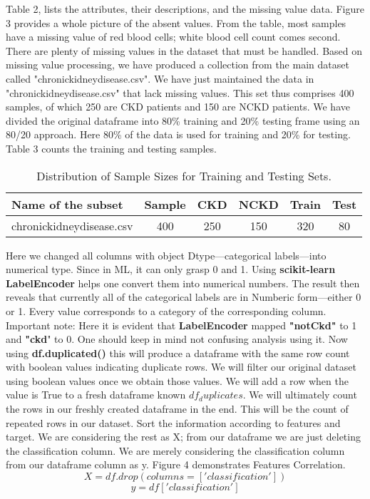 \documentclass[conference]{IEEEtran}
\begin{document}
Table 2, lists the attributes, their descriptions, and the missing value data. Figure 3 provides a whole picture of the absent values. From the table, most samples have a missing value of red blood cells; white blood cell count comes second. There are plenty of missing values in the dataset that must be handled. Based on missing value processing, we have produced a collection from the main dataset called "chronickidneydisease.csv". We have just maintained the data in "chronickidneydisease.csv" that lack missing values. This set thus comprises 400 samples, of which 250 are CKD patients and 150 are NCKD patients. We have divided the original dataframe into 80\% training and 20\% testing frame using an 80/20 approach. Here 80\% of the data is used for training and 20\% for testing. Table 3 counts the training and testing samples.


\begin{table}
\centering
\caption{ Distribution of Sample Sizes for Training and Testing Sets.}
\label{tab:sample-sizes}
\begin{tabular}{|l|c|c|c|c|c|}
\hline
Name of the subset & Sample & CKD & NCKD & Train & Test \\
\hline
chronickidneydisease.csv & 400  & 250 & 150 & 320 & 80 \\
\hline
\end{tabular}
\end{table}

Here we changed all columns with object Dtype—categorical labels—into numerical type. Since in ML, it can only grasp 0 and 1. Using \textbf{scikit-learn LabelEncoder} helps one convert them into numerical numbers. The result then reveals that currently all of the categorical labels are in Numberic form—either 0 or 1. Every value corresponds to a category of the corresponding column. Important note: Here it is evident that \textbf{ LabelEncoder} mapped \textbf{"notCkd"} to 1 and \textbf{"ckd}" to 0. One should keep in mind not confusing analysis using it. Now using \textbf{df.duplicated()} this will produce a dataframe with the same row count with boolean values indicating duplicate rows. We will filter our original dataset using boolean values once we obtain those values. We will add a row when the value is True to a fresh dataframe known \(df_duplicates\). We will ultimately count the rows in our freshly created dataframe in the end. This will be the count of repeated rows in our dataset. Sort the information according to features and target. We are considering the rest as X; from our dataframe we are just deleting the classification column. We are merely considering the classification column from our dataframe column as y. Figure 4 demonstrates Features Correlation.
\[X = df.drop(columns=['classification'])\]
\[y = df['classification']\]
\end{document}
